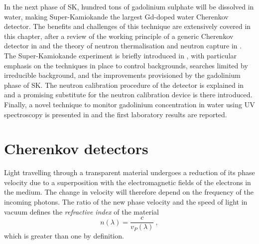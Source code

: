 In the next phase of SK, hundred tons of gadolinium sulphate will be dissolved in water, making %
Super-Kamiokande the largest Gd-doped water Cherenkov detector.	%
The benefits and challenges of this technique are extensively covered in this chapter, %
after a review of the working principle of a generic Cherenkov detector in  %
and the theory of neutron thermalisation and neutron capture in .
The Super-Kamiokande experiment is briefly introduced in , with %
particular emphasis on the techniques in place to control backgrounds, %
searches limited by irreducible background, and the improvements provisioned by the gadolinium phase of SK.
The neutron calibration procedure of the detector is explained in  %
and a promising substitute for the neutron calibration device is there introduced.
Finally, a novel technique to monitor gadolinium concentration in water %
using UV spectroscopy is presented in  and the first laboratory results are reported.

\section{Cherenkov detectors}
\label{sec:wch}


Light travelling through a transparent material undergoes a reduction of its phase velocity %
due to a superposition with the electromagnetic fields of the electrons in the medium. %
The change in velocity will therefore depend on the frequency of the incoming photons.
The ratio of the new phase velocity and the speed of light in vacuum defines the \emph{refractive index} %
of the material
\begin{equation}
	\label{eq:ref_index}
	n(\lambda) = \frac{c}{v_P(\lambda)}\ ,
\end{equation}
which is greater than one by definition.

